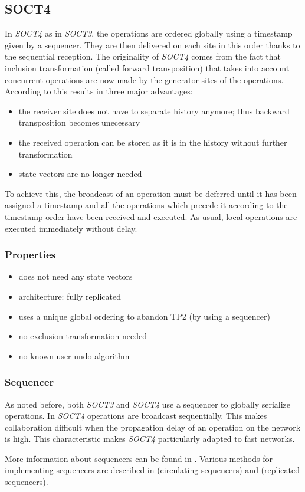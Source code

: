 \subsection{SOCT4}
\label{algo:soct4}

In \emph{SOCT4} \cite{suleiman00} as in \emph{SOCT3}, the operations are ordered globally using a timestamp given by a sequencer. They are then delivered on each site in this order thanks to the sequential reception. The originality of \emph{SOCT4} comes from the fact that inclusion transformation (called forward transposition) that takes into account concurrent operations are now made by the generator sites of the operations. According to \cite{suleiman00} this results in three major advantages:

\begin{itemize}
 \item the receiver site does not have to separate history anymore; 
       thus backward transposition becomes unecessary
 \item the received operation can be stored as it is in the history
       without further transformation
 \item state vectors are no longer needed
\end{itemize}

To achieve this, the broadcast of an operation must be deferred until it has been assigned a timestamp and all the operations which precede it according to the timestamp order have been received and executed. As usual, local operations are executed immediately without delay.


\subsubsection{Properties}
\begin{itemize}
 \item does not need any state vectors
 \item architecture: fully replicated
 \item uses a unique global ordering to abandon TP2 (by using a sequencer)
 \item no exclusion transformation needed
 \item no known user undo algorithm
\end{itemize}


\subsubsection{Sequencer}
\label{sequencer}
As noted before, both \emph{SOCT3} and \emph{SOCT4} use a sequencer to globally serialize operations. In \emph{SOCT4} operations are broadcast sequentially. This makes collaboration difficult when the propagation delay of an operation on the network is high. This characteristic makes \emph{SOCT4} particularly adapted to fast networks.

More information about sequencers can be found in \cite{reed79}. Various methods for implementing sequencers are described in \cite{lelann78} (circulating sequencers) and \cite{banino79} (replicated sequencers).
